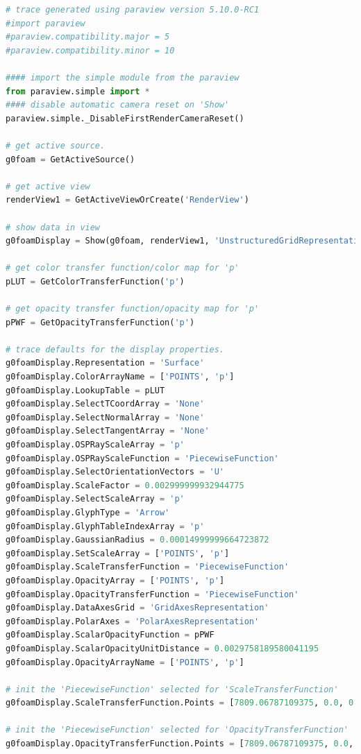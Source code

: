 \documentclass[12pt]{article}
\begin{document}
\begin{lstlisting}[language=python, caption=Script for the generation of images and data from the CFD results., label=lst:ppost]
# trace generated using paraview version 5.10.0-RC1
#import paraview
#paraview.compatibility.major = 5
#paraview.compatibility.minor = 10

#### import the simple module from the paraview
from paraview.simple import *
#### disable automatic camera reset on 'Show'
paraview.simple._DisableFirstRenderCameraReset()

# get active source.
g0foam = GetActiveSource()

# get active view
renderView1 = GetActiveViewOrCreate('RenderView')

# show data in view
g0foamDisplay = Show(g0foam, renderView1, 'UnstructuredGridRepresentation')

# get color transfer function/color map for 'p'
pLUT = GetColorTransferFunction('p')

# get opacity transfer function/opacity map for 'p'
pPWF = GetOpacityTransferFunction('p')

# trace defaults for the display properties.
g0foamDisplay.Representation = 'Surface'
g0foamDisplay.ColorArrayName = ['POINTS', 'p']
g0foamDisplay.LookupTable = pLUT
g0foamDisplay.SelectTCoordArray = 'None'
g0foamDisplay.SelectNormalArray = 'None'
g0foamDisplay.SelectTangentArray = 'None'
g0foamDisplay.OSPRayScaleArray = 'p'
g0foamDisplay.OSPRayScaleFunction = 'PiecewiseFunction'
g0foamDisplay.SelectOrientationVectors = 'U'
g0foamDisplay.ScaleFactor = 0.002999999932944775
g0foamDisplay.SelectScaleArray = 'p'
g0foamDisplay.GlyphType = 'Arrow'
g0foamDisplay.GlyphTableIndexArray = 'p'
g0foamDisplay.GaussianRadius = 0.00014999999664723872
g0foamDisplay.SetScaleArray = ['POINTS', 'p']
g0foamDisplay.ScaleTransferFunction = 'PiecewiseFunction'
g0foamDisplay.OpacityArray = ['POINTS', 'p']
g0foamDisplay.OpacityTransferFunction = 'PiecewiseFunction'
g0foamDisplay.DataAxesGrid = 'GridAxesRepresentation'
g0foamDisplay.PolarAxes = 'PolarAxesRepresentation'
g0foamDisplay.ScalarOpacityFunction = pPWF
g0foamDisplay.ScalarOpacityUnitDistance = 0.0029758189580041195
g0foamDisplay.OpacityArrayName = ['POINTS', 'p']

# init the 'PiecewiseFunction' selected for 'ScaleTransferFunction'
g0foamDisplay.ScaleTransferFunction.Points = [7809.06787109375, 0.0, 0.5, 0.0, 271724.0, 1.0, 0.5, 0.0]

# init the 'PiecewiseFunction' selected for 'OpacityTransferFunction'
g0foamDisplay.OpacityTransferFunction.Points = [7809.06787109375, 0.0, 0.5, 0.0, 271724.0, 1.0, 0.5, 0.0]


\end{lstlisting}
\end{document}
